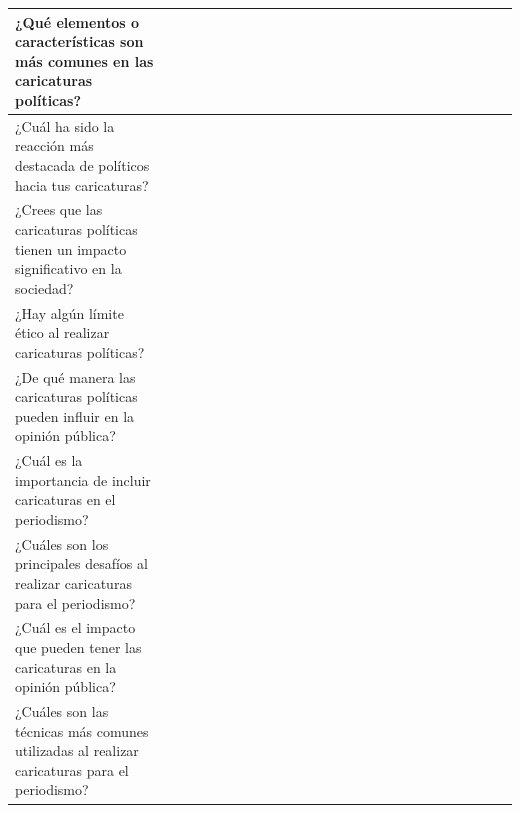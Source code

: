 \documentclass[12pt,a4paper]{article}
\begin{document}
\begin{landscape}
\begin{table}[ht!]
\begin{tabular}{|l|l|l|l|l|l|l|l|l|l|l|l|l|l|l|l|l|l|l|l|l|l|l|l|l|l|}
			¿Qué elementos o características son más comunes en las caricaturas políticas?                         &                                          &    &    &    &    &    &    &    &    &     &     &     &     &     &     &     &     &     &     &     &           \\\hline
			¿Cuál ha sido la reacción más destacada de políticos hacia tus caricaturas?                            &                                          &    &    &    &    &    &    &    &    &     &     &     &     &     &     &     &     &     &     &     &           \\\hline
			¿Crees que las caricaturas políticas tienen un impacto significativo en la sociedad?                   &                                          &    &    &    &    &    &    &    &    &     &     &     &     &     &     &     &     &     &     &     &           \\\hline
			¿Hay algún límite ético al realizar caricaturas políticas?                                             &                                          &    &    &    &    &    &    &    &    &     &     &     &     &     &     &     &     &     &     &     &           \\\hline
			¿De qué manera las caricaturas políticas pueden influir en la opinión pública?                         &                                          &    &    &    &    &    &    &    &    &     &     &     &     &     &     &     &     &     &     &     &           \\\hline
			¿Cuál es la importancia de incluir caricaturas en el periodismo?                                       &                                          &    &    &    &    &    &    &    &    &     &     &     &     &     &     &     &     &     &     &     &           \\\hline
			¿Cuáles son los principales desafíos al realizar caricaturas para el periodismo?                       &                                          &    &    &    &    &    &    &    &    &     &     &     &     &     &     &     &     &     &     &     &           \\\hline
			¿Cuál es el impacto que pueden tener las caricaturas en la opinión pública?                            &                                          &    &    &    &    &    &    &    &    &     &     &     &     &     &     &     &     &     &     &     &           \\\hline
			¿Cuáles son las técnicas más comunes utilizadas al realizar caricaturas para el periodismo?            &                                          &    &    &    &    &    &    &    &    &     &     &     &     &     &     &     &     &     &     &     &           \\\hline

\end{tabular}
\end{table}
\end{landscape}
\end{document}
